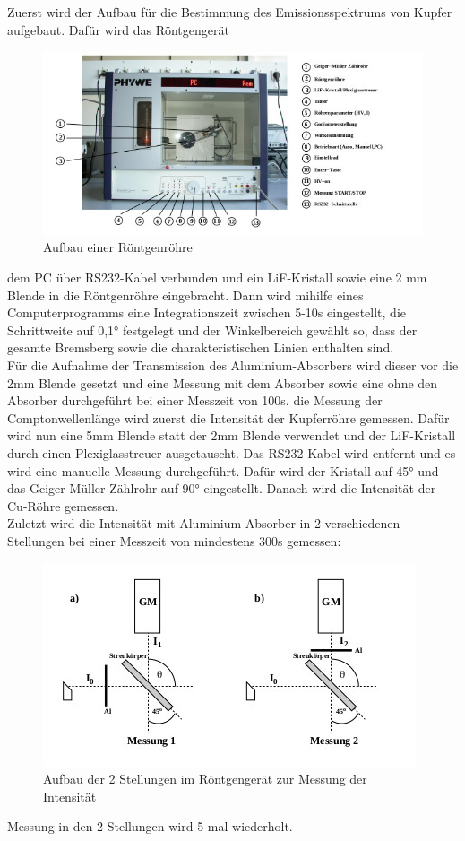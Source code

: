 Zuerst wird der Aufbau für die Bestimmung des Emissionsspektrums von Kupfer aufgebaut.
Dafür wird das Röntgengerät 
\begin{figure}[H]
    \centering
    \includegraphics[width=\linewidth]{./images/Aufbau1.jpg}
    \caption{Aufbau einer Röntgenröhre \cite{V603}}
    \label{fig:1}
\end{figure}
 \justifying dem PC über RS232-Kabel verbunden und ein  LiF-Kristall sowie eine 2 mm Blende in die Röntgenröhre eingebracht. Dann wird mihilfe
eines Computerprogramms eine Integrationszeit zwischen 5-10s eingestellt, die Schrittweite auf 0,1°
festgelegt und der Winkelbereich gewählt so, dass der gesamte Bremsberg sowie die
charakteristischen Linien enthalten sind. \\
Für die Aufnahme der Transmission des Aluminium-Absorbers wird dieser vor die 2mm Blende gesetzt
und eine Messung mit dem Absorber sowie eine ohne den Absorber durchgeführt bei einer Messzeit von 100s.
\justifying die Messung der Comptonwellenlänge wird zuerst die Intensität der Kupferröhre gemessen.
Dafür wird nun eine 5mm Blende statt der 2mm Blende verwendet und der LiF-Kristall
durch einen Plexiglasstreuer ausgetauscht. Das RS232-Kabel wird entfernt und es wird
eine manuelle Messung durchgeführt. Dafür wird der Kristall auf 45° und das Geiger-Müller Zählrohr auf 90°
eingestellt. Danach wird die Intensität der Cu-Röhre gemessen.\\
Zuletzt wird die Intensität mit Aluminium-Absorber in 2 verschiedenen Stellungen bei einer Messzeit von mindestens 300s
gemessen: 
\begin{figure}[H]
    \centering
    \includegraphics[width=\linewidth]{./images/Aufbau2.jpg}
    \caption{Aufbau der 2  Stellungen im Röntgengerät zur Messung der Intensität \cite{V603}}
    \label{fig:2}
\end{figure}
\justifying Messung in den 2 Stellungen wird 5 mal wiederholt.

